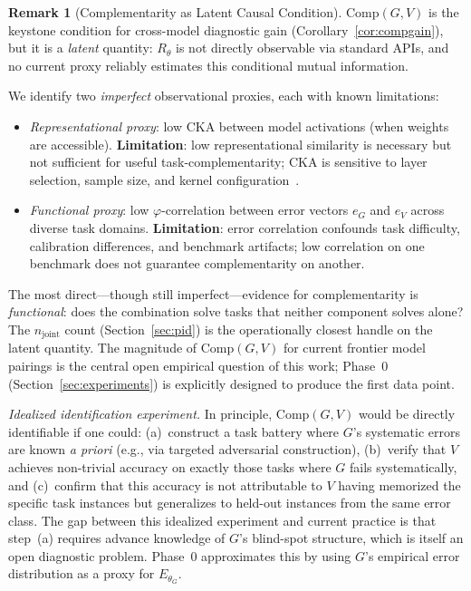 \documentclass[11pt,a4paper]{article}
\theoremstyle{definition}
\newtheorem{remark}{Remark}[section]
\newcommand{\thetaG}{\theta_G}
\begin{document}
\begin{remark}[Complementarity as Latent Causal Condition]
\label{rem:latentcomp}
$\mathrm{Comp}(G,V)$ is the keystone condition for cross-model diagnostic gain (Corollary~\ref{cor:compgain}), but it is a \emph{latent} quantity: $R_\theta$ is not directly observable via standard APIs, and no current proxy reliably estimates this conditional mutual information.

We identify two \emph{imperfect} observational proxies, each with known limitations:
\begin{itemize}[leftmargin=*,itemsep=2pt]
\item \emph{Representational proxy}: low CKA between model activations (when weights are accessible). \textbf{Limitation}: low representational similarity is necessary but not sufficient for useful task-complementarity; CKA is sensitive to layer selection, sample size, and kernel configuration~\cite{davari2022cka}.
\item \emph{Functional proxy}: low $\varphi$-correlation between error vectors $e_G$ and $e_V$ across diverse task domains. \textbf{Limitation}: error correlation confounds task difficulty, calibration differences, and benchmark artifacts; low correlation on one benchmark does not guarantee complementarity on another.
\end{itemize}
The most direct---though still imperfect---evidence for complementarity is \emph{functional}: does the combination solve tasks that neither component solves alone? The $n_\text{joint}$ count (Section~\ref{sec:pid}) is the operationally closest handle on the latent quantity. The magnitude of $\mathrm{Comp}(G,V)$ for current frontier model pairings is the central open empirical question of this work; Phase~0 (Section~\ref{sec:experiments}) is explicitly designed to produce the first data point.

\emph{Idealized identification experiment.} In principle, $\mathrm{Comp}(G,V)$ would be directly identifiable if one could: (a)~construct a task battery where $G$'s systematic errors are known \emph{a priori} (e.g., via targeted adversarial construction), (b)~verify that $V$ achieves non-trivial accuracy on exactly those tasks where $G$ fails systematically, and (c)~confirm that this accuracy is not attributable to $V$ having memorized the specific task instances but generalizes to held-out instances from the same error class. The gap between this idealized experiment and current practice is that step~(a) requires advance knowledge of $G$'s blind-spot structure, which is itself an open diagnostic problem. Phase~0 approximates this by using $G$'s empirical error distribution as a proxy for $E_{\thetaG}$.
\end{remark}
\end{document}
